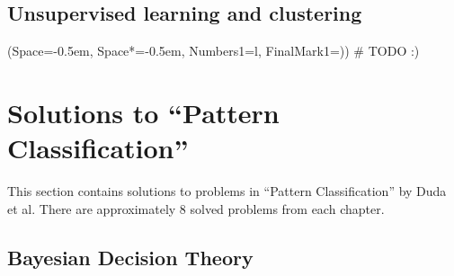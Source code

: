 \documentclass[12pt, a4paper]{article}
\newcommand{\listSpace}{-0.5em}%
\begin{document}
\subsection{Unsupervised learning and clustering}
\begin{easylist}[itemize]
	\ListProperties(Space=\listSpace, Space*=\listSpace, Numbers1=l, FinalMark1={)})
	# TODO :)
\end{easylist}




\clearpage
\section{Solutions to ``Pattern Classification''}

This section contains solutions to problems in ``Pattern Classification'' by Duda et al.
There are approximately 8 solved problems from each chapter.

\setcounter{subsection}{1}
\subsection{Bayesian Decision Theory}
\end{document}
